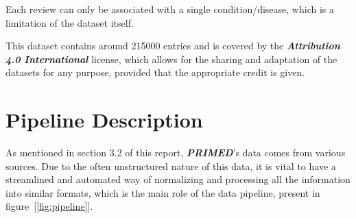 \documentclass[sigconf]{acmart}
\begin{document}
Each review can only be associated with a single condition/disease, which is a limitation of the dataset itself.

This dataset contains around 215000 entries and is covered by the \textit{\textbf{Attribution 4.0 International}}\cite{ccfour} license, which allows for the sharing and adaptation of the datasets for any purpose, provided that the appropriate credit is given.

\section{Pipeline Description}

As mentioned in section 3.2 of this report, \textit{\textbf{PRIMED}}'s data comes from various sources. Due to the often unstructured nature of this data, it is vital to have a streamlined and automated way of normalizing and processing all the information into similar formats, which is the main role of the data pipeline, present in figure~[\ref{fig:pipeline}].
\end{document}

